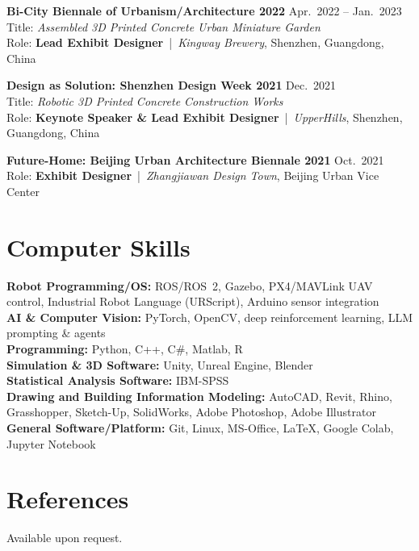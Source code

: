 \documentclass[11pt,a4paper]{article}
\newcommand{\entrytitle}[1]{\textbf{#1}}
\newcommand{\entrydetail}[1]{\textit{#1}}
\begin{document}
\entrytitle{Bi-City Biennale of Urbanism/Architecture 2022} \hfill Apr.\ 2022 -- Jan.\ 2023 \\
Title: \entrydetail{Assembled 3D Printed Concrete Urban Miniature Garden} \\
Role: \textbf{Lead Exhibit Designer} \,|\, \entrydetail{Kingway Brewery}, Shenzhen, Guangdong, China

\entrytitle{Design as Solution: Shenzhen Design Week 2021} \hfill Dec.\ 2021 \\
Title: \entrydetail{Robotic 3D Printed Concrete Construction Works} \\
Role: \textbf{Keynote Speaker \& Lead Exhibit Designer} \,|\, \entrydetail{UpperHills}, Shenzhen, Guangdong, China

\entrytitle{Future-Home: Beijing Urban Architecture Biennale 2021} \hfill Oct.\ 2021 \\
Role: \textbf{Exhibit Designer} \,|\, \entrydetail{Zhangjiawan Design Town}, Beijing Urban Vice Center

\section{Computer Skills}

\textbf{Robot Programming/OS:} ROS/ROS~2, Gazebo, PX4/MAVLink UAV control, Industrial Robot Language (URScript), Arduino sensor integration \\
\textbf{AI \& Computer Vision:} PyTorch, OpenCV, deep reinforcement learning, LLM prompting \& agents \\
\textbf{Programming:} Python, C++, C\#, Matlab, R \\
\textbf{Simulation \& 3D Software:} Unity, Unreal Engine, Blender \\
\textbf{Statistical Analysis Software:} IBM-SPSS \\
\textbf{Drawing and Building Information Modeling:} AutoCAD, Revit, Rhino, Grasshopper, Sketch-Up, SolidWorks, Adobe Photoshop, Adobe Illustrator \\
\textbf{General Software/Platform:} Git, Linux, MS-Office, \LaTeX, Google Colab, Jupyter Notebook

\section{References}

Available upon request.
\end{document}
